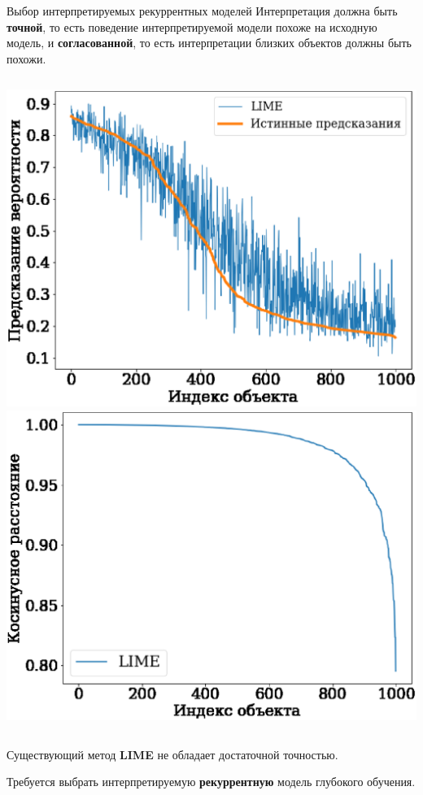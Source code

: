\documentclass{beamer}
\begin{document}
\begin{frame}{Выбор интерпретируемых рекуррентных моделей}
Интерпретация должна быть {\color{red}\textbf{точной}}, то есть поведение интерпретируемой модели похоже на исходную модель, и {\color{red}\textbf{согласованной}}, то есть интерпретации близких объектов должны быть похожи.

\begin{columns}[c]
\includegraphics[width=\textwidth]{../figures/lime_proba.eps}
\includegraphics[width=\textwidth]{../figures/lime_cosine.eps}
\end{columns}
Существующий метод \textbf{LIME} не обладает достаточной точностью.

Требуется выбрать интерпретируемую \textbf{рекуррентную} модель глубокого обучения.
\end{frame}
\end{document}

